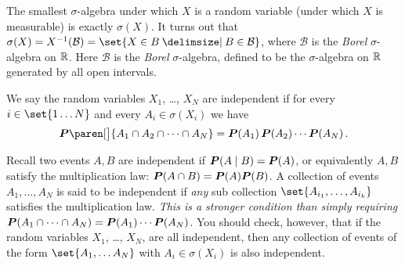\begin{remark}
  The smallest $\sigma$-algebra under which $X$ is a random variable (under which $X$ is measurable) is exactly $\sigma(X)$.
  It turns out that $\sigma(X) = X^{-1}(\mathcal B) =  \set{X \in B \st B \in \mathcal B}$, where $\mathcal B$ is the \emph{Borel} $\sigma$-algebra on $\R$.
  Here $\mathcal B$ is the \emph{Borel} $\sigma$-algebra, defined to be the $\sigma$-algebra on $\R$ generated by all open intervals.
\end{remark}
\iffalse
\begin{definition}
  We say two random variables $X$ and $Y$ are independent if for every $A \in \sigma(X)$ and $B \in \sigma(Y)$, the events $A$ and $B$ are independent (i.e.\ $\P(A \cap B) = P(A) P(B)$, or $P(A \given B) = P(A)$).
\end{definition}
\fi
\begin{definition}
  We say the random variables $X_1$, \dots, $X_N$ are independent if for every $i \in \set{1 \dots N}$ and every $A_i \in \sigma(X_i)$ we have
  \begin{equation*}
    \P\paren[\big]{ A_1 \cap A_2 \cap \cdots \cap A_N } = \P(A_1) \, \P(A_2) \cdots \P(A_N) \, .
  \end{equation*}
\end{definition}
\begin{remark}
  Recall two events $A, B$ are independent if $\P(A \given B) = \P(A)$, or equivalently $A, B$ satisfy the multiplication law: $\P(A \cap B) = \P(A) \P(B)$.
  A collection of events $A_1, \dots, A_N$ is said to be independent if \emph{any} sub collection $\set{A_{i_1}, \dots, A_{i_k}}$ satisfies the multiplication law.
  \emph{This is a stronger condition than simply requiring $\P(A_1 \cap \cdots \cap A_N) = \P(A_1) \cdots \P(A_N)$.}
  You should check, however, that if the random variables $X_1$, \dots, $X_N$, are all independent, then any collection of events of the form $\set{A_1, \dots A_N}$ with $A_i \in \sigma(X_i)$ is also independent.
\end{remark}

